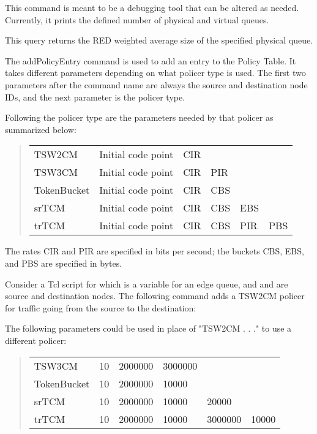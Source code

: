 This command is meant to be a debugging tool that can be altered as needed.  Currently, it prints the defined number of physical and virtual queues.


This query returns the RED weighted average size of the specified physical queue.

The addPolicyEntry command is used to add an entry to the Policy Table.  It takes different parameters depending on what policer type is used.  The first two parameters after the command name are always the source and destination node IDs, and the next parameter is the policer type. 

Following the policer type are the parameters needed by that policer as summarized below:

\begin{quote}
\begin{tabular}{llllll}
TSW2CM&{Initial code point}&CIR\\
TSW3CM&{Initial code point}&CIR&PIR\\
TokenBucket&{Initial code point}&CIR&CBS\\
srTCM&{Initial code point}&CIR&CBS&EBS\\
trTCM&{Initial code point}&CIR&CBS&PIR&PBS
\end{tabular}
\end{quote}

The rates CIR and PIR are specified in bits per second; the buckets CBS, EBS, and PBS are specified in bytes.
 
Consider a Tcl script for which  is a variable for an edge queue, 
and  and  are source and destination nodes.   
The following command adds a TSW2CM policer for traffic going from the source to the destination:


The following parameters could be used in place of "TSW2CM . . ." to use a different policer:
\begin{quote}
\begin{tabular}{llllll}
TSW3CM&10&2000000&3000000\\
TokenBucket&10&2000000&10000\\
srTCM&10&2000000&10000&20000\\
trTCM&10&2000000&10000&3000000&10000
\end{tabular}
\end{quote}

